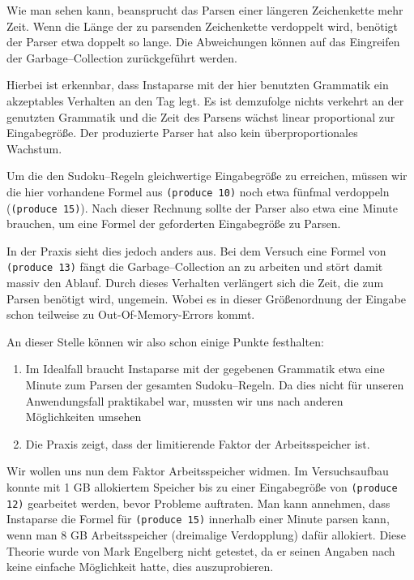 \documentclass[ngerman,a4paper,abstracton,open=right,twoside=false,toc=listofnumbered,bibtotocnumbered]{scrreprt}
\begin{document}
Wie man sehen kann, beansprucht das Parsen einer längeren Zeichenkette mehr Zeit. Wenn die Länge der zu parsenden Zeichenkette verdoppelt wird, benötigt der Parser etwa doppelt so lange. Die Abweichungen können auf das Eingreifen der Garbage--Collection zurückgeführt werden.

Hierbei ist erkennbar, dass Instaparse mit der hier benutzten Grammatik ein akzeptables Verhalten an den Tag legt. Es ist demzufolge nichts verkehrt an der genutzten Grammatik und die Zeit des Parsens wächst linear proportional zur Eingabegröße. Der produzierte Parser hat also kein überproportionales Wachstum.

Um die den Sudoku--Regeln gleichwertige Eingabegröße zu erreichen, müssen wir die hier vorhandene Formel aus \lstinline|(produce 10)| noch etwa fünfmal verdoppeln (\lstinline|(produce 15)|). Nach dieser Rechnung sollte der Parser also etwa eine Minute brauchen, um eine Formel der geforderten Eingabegröße zu Parsen.

In der Praxis sieht dies jedoch anders aus. Bei dem Versuch eine Formel von \lstinline|(produce 13)| fängt die Garbage--Collection an zu arbeiten und stört damit massiv den Ablauf. Durch dieses Verhalten verlängert sich die Zeit, die zum Parsen benötigt wird, ungemein. Wobei es in dieser Größenordnung der Eingabe schon teilweise zu Out-Of-Memory-Errors kommt.

An dieser Stelle können wir also schon einige Punkte festhalten:

\begin{enumerate}
	\item Im Idealfall braucht Instaparse mit der gegebenen Grammatik etwa eine Minute zum Parsen der gesamten Sudoku--Regeln. Da dies nicht für unseren Anwendungsfall praktikabel war, mussten wir uns nach anderen Möglichkeiten umsehen
	\item Die Praxis zeigt, dass der limitierende Faktor der Arbeitsspeicher ist.
\end{enumerate}

Wir wollen uns nun dem Faktor Arbeitsspeicher widmen. Im Versuchsaufbau konnte mit 1 GB allokiertem Speicher bis zu einer Eingabegröße von \lstinline|(produce 12)| gearbeitet werden, bevor Probleme auftraten. Man kann annehmen, dass Instaparse die Formel für \lstinline|(produce 15)| innerhalb einer Minute parsen kann, wenn man 8 GB Arbeitsspeicher (dreimalige Verdopplung) dafür allokiert. Diese Theorie wurde von Mark Engelberg nicht getestet, da er seinen Angaben nach keine einfache Möglichkeit hatte, dies auszuprobieren.\\
\end{document}
